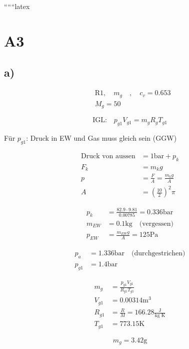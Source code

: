 
``````latex


\section*{A3}

\subsection*{a)}

\begin{align*}
&\text{R}1, \quad m_{g} \quad , \quad c_{v} = 0.653 \\
&M_{g} = 50
\end{align*}

\begin{equation*}
\text{IGL:} \quad p_{g1} V_{g1} = m_{g} R_{g} T_{g1}
\end{equation*}

Für $p_{g1}$: Druck in EW und Gas muss gleich sein (GGW)

\begin{align*}
\text{Druck von aussen} &= 1 \text{bar} + p_{k} \\
F_{k} &= m_{k} g \\
p &= \frac{F}{A} = \frac{m_{k} g}{A} \\
A &= \left( \frac{10}{2} \right)^2 \pi
\end{align*}

\begin{align*}
p_{k} &= \frac{82.9 \cdot 9.81}{0.00785} = 0.336 \text{bar} \\
m_{EW} &= 0.1 \text{kg} \quad \text{(vergessen)} \\
p_{EW} &= \frac{m_{EW} g}{A} = 125 \text{Pa}
\end{align*}

\begin{align*}
p_{a} &= 1.336 \text{bar} \quad \text{(durchgestrichen)} \\
p_{g1} &= 1.4 \text{bar}
\end{align*}

\begin{align*}
m_{g} &= \frac{p_{g1} V_{g1}}{R_{g1} T_{g1}} \\
V_{g1} &= 0.00314 \text{m}^3 \\
R_{g1} &= \frac{R}{M} = 166.28 \frac{\text{J}}{\text{kg K}} \\
T_{g1} &= 773.15 \text{K}
\end{align*}

\begin{equation*}
m_{g} = 3.42 \text{g}
\end{equation*}

